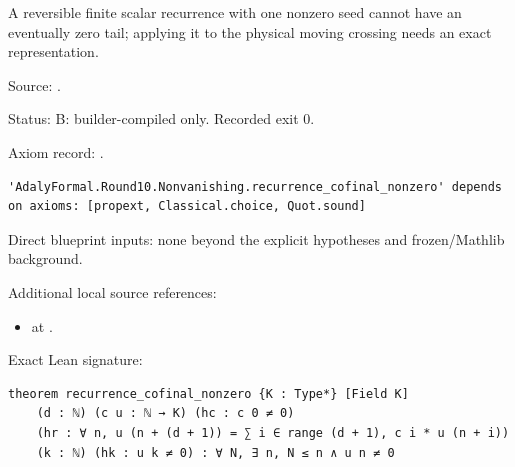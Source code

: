\begin{theorem}[bp-186]
\label{bp-186}
\uses{}
\leanok
A reversible finite scalar recurrence with one nonzero seed cannot have an eventually zero tail; applying it to the physical moving crossing needs an exact representation.

\par Source: \texttt{}.
\par Status: B: builder-compiled only. Recorded exit 0.
\par Axiom record: \texttt{}.
\begin{verbatim}
'AdalyFormal.Round10.Nonvanishing.recurrence_cofinal_nonzero' depends on axioms: [propext, Classical.choice, Quot.sound]
\end{verbatim}
\par Direct blueprint inputs: none beyond the explicit hypotheses and frozen/Mathlib background.
\par Additional local source references:
\begin{itemize}
\item \texttt{} at \texttt{}.
\end{itemize}
\par Exact Lean signature:
\begin{verbatim}
theorem recurrence_cofinal_nonzero {K : Type*} [Field K]
    (d : ℕ) (c u : ℕ → K) (hc : c 0 ≠ 0)
    (hr : ∀ n, u (n + (d + 1)) = ∑ i ∈ range (d + 1), c i * u (n + i))
    (k : ℕ) (hk : u k ≠ 0) : ∀ N, ∃ n, N ≤ n ∧ u n ≠ 0
\end{verbatim}
\end{theorem}


